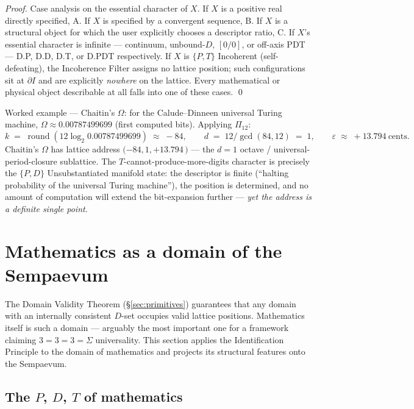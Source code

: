 \documentclass[11pt,a4paper]{article}
\theoremstyle{definition}
\theoremstyle{remark}
\DeclareMathOperator{\round}{round}
\newcommand{\eps}{\varepsilon}
\begin{document}
\begin{proof}
Case analysis on the essential character of $X$. If $X$ is a positive real directly specified, A. If $X$ is specified by a convergent sequence, B. If $X$ is a structural object for which the user explicitly chooses a descriptor ratio, C. If $X$'s essential character is infinite --- continuum, unbound-$D$, $[0/0]$, or off-axis PDT --- D.P, D.D, D.T, or D.PDT respectively. If $X$ is $\{P,T\}$ Incoherent (self-defeating), the Incoherence Filter assigns no lattice position; such configurations sit at $\partial I$ and are explicitly \emph{nowhere} on the lattice. Every mathematical or physical object describable at all falls into one of these cases. \qed
\end{proof}

Worked example --- Chaitin's $\Omega$: for the Calude--Dinneen universal Turing machine, $\Omega \approx 0.00787499699$ (first computed bits). Applying $\Pi_{12}$:
\[
k \;=\; \round(12\log_{2}0.00787499699) \;\approx\; -84,
\qquad
d \;=\; 12/\gcd(84,12) \;=\; 1,
\qquad
\eps \;\approx\; +13.794\ \text{cents}.
\]
Chaitin's $\Omega$ has lattice address $(-84, 1, +13.794$\,\textcent$)$ --- the $d=1$ octave / universal-period-closure sublattice. The $T$-cannot-produce-more-digits character is precisely the $\{P,D\}$ Unsubstantiated manifold state: the descriptor is finite (``halting probability of the universal Turing machine''), the position is determined, and no amount of computation will extend the bit-expansion further --- \emph{yet the address is a definite single point}.

\section{Mathematics as a domain of the Sempaevum}\label{sec:math-domain}

The Domain Validity Theorem (\S\ref{sec:primitives}) guarantees that any domain with an internally consistent $D$-set occupies valid lattice positions. Mathematics itself is such a domain --- arguably the most important one for a framework claiming $3=3=3=\Sigma$ universality. This section applies the Identification Principle to the domain of mathematics and projects its structural features onto the Sempaevum.

\subsection{The $P$, $D$, $T$ of mathematics}
\end{document}
